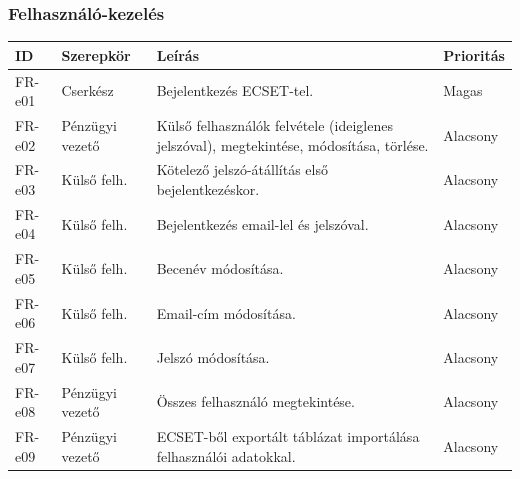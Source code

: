 \documentclass[a4paper,12pt]{article}
\begin{document}
\subsubsection{Felhasználó-kezelés}
\begin{table}[H]
  \centering
  \begin{tabular}{llL{8.5cm}l}
  \toprule
  ID & Szerepkör & Leírás & Prioritás \\
  \midrule
  FR-e01 & Cserkész         & Bejelentkezés ECSET-tel.                                                                  & Magas\\
  FR-e02 & Pénzügyi vezető  & Külső felhasználók felvétele (ideiglenes jelszóval), megtekintése, módosítása, törlése.   & Alacsony\\
  FR-e03 & Külső felh.      & Kötelező jelszó-átállítás első bejelentkezéskor.                                          & Alacsony\\
  FR-e04 & Külső felh.      & Bejelentkezés email-lel és jelszóval.                                                     & Alacsony\\
  FR-e05 & Külső felh.      & Becenév módosítása.                                                                       & Alacsony\\
  FR-e06 & Külső felh.      & Email-cím módosítása.                                                                     & Alacsony\\
  FR-e07 & Külső felh.      & Jelszó módosítása.                                                                        & Alacsony\\
  FR-e08 & Pénzügyi vezető  & Összes felhasználó megtekintése.                                                          & Alacsony\\
  FR-e09 & Pénzügyi vezető  & ECSET-ből exportált táblázat importálása felhasználói adatokkal.                          & Alacsony\\
  \bottomrule
  \end{tabular}
\end{table}
\end{document}
